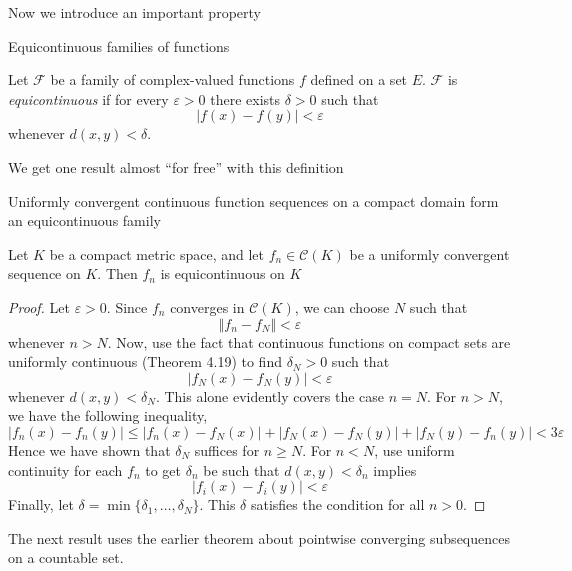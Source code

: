 Now we introduce an important property 

\begin{definition} Equicontinuous families of functions

    Let $\mathscr{F}$ be a family of complex-valued functions $f$ defined on a set $E$. $\mathscr{F}$ is \textit{equicontinuous} if for every $\varepsilon > 0$ there exists $\delta > 0$ such that
    \[|f(x) - f(y)| < \varepsilon\]
    whenever $d(x, y) < \delta$.
\end{definition}

We get one result almost ``for free'' with this definition

\begin{theorem}Uniformly convergent continuous function sequences on a compact domain form an equicontinuous family

    Let $K$ be a compact metric space, and let $f_n \in \mathscr{C}(K)$ be a uniformly convergent sequence on $K$. Then $f_n$ is equicontinuous on $K$
\end{theorem}

\begin{proof}
    Let $\varepsilon > 0$. Since $f_n$ converges in $\mathscr{C}(K)$, we can choose $N$ such that
    \[\Vert f_n - f_N \Vert < \varepsilon\]
    whenever $n > N$. Now, use the fact that continuous functions on compact sets are uniformly continuous (Theorem 4.19) to find $\delta_N > 0$ such that 
    \[|f_N(x) - f_N(y)| < \varepsilon\]
    whenever $d(x, y) < \delta_N$. This alone evidently covers the case $n = N$. For $n > N$, we have the following inequality,
    \[|f_n(x) - f_n(y)| \leq |f_n(x) - f_N(x)| + |f_N(x) - f_N(y)| + |f_N(y) - f_n(y)| < 3\varepsilon\]
    Hence we have shown that $\delta_N$ suffices for $n \geq N$. For $n < N$, use uniform continuity for each $f_n$ to get $\delta_n$ be such that $d(x, y) < \delta_n$ implies
    \[|f_i(x) - f_i(y)| < \varepsilon\]
    Finally, let $\delta = \min \{\delta_1, \ldots, \delta_N\}$. This $\delta$ satisfies the condition for all $n > 0$.
\end{proof}

The next result uses the earlier theorem about pointwise converging subsequences on a countable set.

